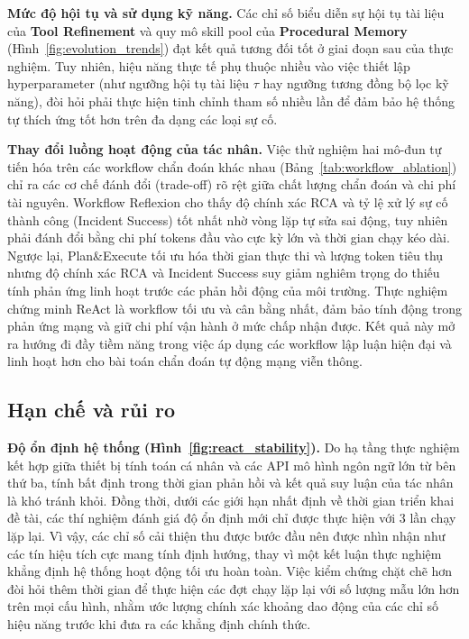 \noindent\textbf{Mức độ hội tụ và sử dụng kỹ năng.} Các chỉ số biểu diễn sự hội tụ tài liệu của \textbf{Tool Refinement} và quy mô skill pool của \textbf{Procedural Memory} (Hình~\ref{fig:evolution_trends}) đạt kết quả tương đối tốt ở giai đoạn sau của thực nghiệm. Tuy nhiên, hiệu năng thực tế phụ thuộc nhiều vào việc thiết lập hyperparameter (như ngưỡng hội tụ tài liệu $\tau$ hay ngưỡng tương đồng bộ lọc kỹ năng), đòi hỏi phải thực hiện tinh chỉnh tham số nhiều lần để đảm bảo hệ thống tự thích ứng tốt hơn trên đa dạng các loại sự cố.

\noindent\textbf{Thay đổi luồng hoạt động của tác nhân.} Việc thử nghiệm hai mô-đun tự tiến hóa trên các workflow chẩn đoán khác nhau (Bảng~\ref{tab:workflow_ablation}) chỉ ra các cơ chế đánh đổi (trade-off) rõ rệt giữa chất lượng chẩn đoán và chi phí tài nguyên. Workflow Reflexion cho thấy độ chính xác RCA và tỷ lệ xử lý sự cố thành công (Incident Success) tốt nhất nhờ vòng lặp tự sửa sai động, tuy nhiên phải đánh đổi bằng chi phí tokens đầu vào cực kỳ lớn và thời gian chạy kéo dài. Ngược lại, Plan\&Execute tối ưu hóa thời gian thực thi và lượng token tiêu thụ nhưng độ chính xác RCA và Incident Success suy giảm nghiêm trọng do thiếu tính phản ứng linh hoạt trước các phản hồi động của môi trường. Thực nghiệm chứng minh ReAct là workflow tối ưu và cân bằng nhất, đảm bảo tính động trong phản ứng mạng và giữ chi phí vận hành ở mức chấp nhận được. Kết quả này mở ra hướng đi đầy tiềm năng trong việc áp dụng các workflow lập luận hiện đại và linh hoạt hơn cho bài toán chẩn đoán tự động mạng viễn thông.

\subsection{Hạn chế và rủi ro}

\noindent\textbf{Độ ổn định hệ thống (Hình~\ref{fig:react_stability}).} Do hạ tầng thực nghiệm kết hợp giữa thiết bị tính toán cá nhân và các API mô hình ngôn ngữ lớn từ bên thứ ba, tính bất định trong thời gian phản hồi và kết quả suy luận của tác nhân là khó tránh khỏi. Đồng thời, dưới các giới hạn nhất định về thời gian triển khai đề tài, các thí nghiệm đánh giá độ ổn định mới chỉ được thực hiện với $3$ lần chạy lặp lại. Vì vậy, các chỉ số cải thiện thu được bước đầu nên được nhìn nhận như các tín hiệu tích cực mang tính định hướng, thay vì một kết luận thực nghiệm khẳng định hệ thống hoạt động tối ưu hoàn toàn. Việc kiểm chứng chặt chẽ hơn đòi hỏi thêm thời gian để thực hiện các đợt chạy lặp lại với số lượng mẫu lớn hơn trên mọi cấu hình, nhằm ước lượng chính xác khoảng dao động của các chỉ số hiệu năng trước khi đưa ra các khẳng định chính thức.


